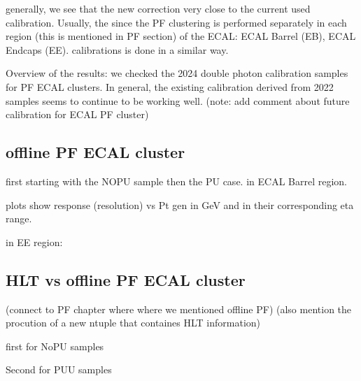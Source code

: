 generally, we see that the new correction very close to the current used calibration. Usually, the since the PF clustering is performed separately in each region (this is mentioned in PF section) of the ECAL: ECAL Barrel (EB), ECAL Endcaps (EE). calibrations is done in a similar way.

Overview of the results: we checked the 2024 double photon calibration samples for PF ECAL clusters. In general, the existing calibration derived from 2022 samples seems to continue to be working well. (note: add comment about future calibration for ECAL PF cluster)


\subsection{offline PF ECAL cluster}

first starting with the NOPU sample then the PU case. in ECAL Barrel region. 

plots show response (resolution) vs Pt gen in GeV and in their corresponding eta range.






in EE region:





\subsection{HLT vs offline PF ECAL cluster}

(connect to PF chapter where where we mentioned offline PF)
(also mention the procution of a new ntuple that containes HLT information) 

first for NoPU samples

Second for PUU samples

